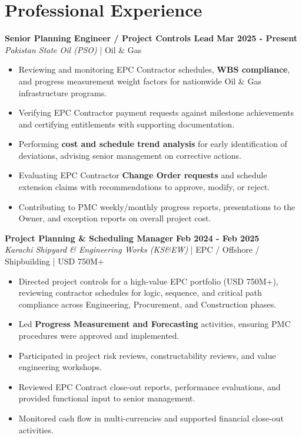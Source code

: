 \documentclass[11pt,a4paper]{article}
\begin{document}
\section{Professional Experience}
\noindent \textbf{\large Senior Planning Engineer / Project Controls Lead} \hfill \textbf{\color{awesome-blue}Mar 2025 - Present}\\
\textit{Pakistan State Oil (PSO)} | Oil \& Gas\\
\begin{itemize}
    \item Reviewing and monitoring EPC Contractor schedules, \textbf{WBS compliance}, and progress measurement weight factors for nationwide Oil \& Gas infrastructure programs.
    \item Verifying EPC Contractor payment requests against milestone achievements and certifying entitlements with supporting documentation.
    \item Performing \textbf{cost and schedule trend analysis} for early identification of deviations, advising senior management on corrective actions.
    \item Evaluating EPC Contractor \textbf{Change Order requests} and schedule extension claims with recommendations to approve, modify, or reject.
    \item Contributing to PMC weekly/monthly progress reports, presentations to the Owner, and exception reports on overall project cost.
\end{itemize}

\noindent \textbf{\large Project Planning \& Scheduling Manager} \hfill \textbf{\color{awesome-blue}Feb 2024 - Feb 2025}\\
\textit{Karachi Shipyard \& Engineering Works (KS\&EW)} | EPC / Offshore / Shipbuilding | USD 750M+\\
\begin{itemize}
    \item Directed project controls for a high-value EPC portfolio (USD 750M+), reviewing contractor schedules for logic, sequence, and critical path compliance across Engineering, Procurement, and Construction phases.
    \item Led \textbf{Progress Measurement and Forecasting} activities, ensuring PMC procedures were approved and implemented.
    \item Participated in project risk reviews, constructability reviews, and value engineering workshops.
    \item Reviewed EPC Contract close-out reports, performance evaluations, and provided functional input to senior management.
    \item Monitored cash flow in multi-currencies and supported financial close-out activities.
\end{itemize}
\end{document}
